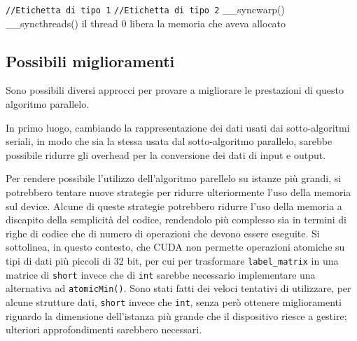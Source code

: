 \documentclass[12pt]{article}
\begin{document}
\begin{algorithm}[H]
{{{{                    }
                    \texttt{//Etichetta di tipo 1}\;
                    \texttt{//Etichetta di tipo 2}\;
                }
            }
            \_\_syncwarp()\;
        }
        \_\_syncthreads()\;
        \;
        il thread 0 libera la memoria che aveva allocato\;
    \end{algorithm}

    \subsection{Possibili miglioramenti}
    \label{PossibiliMiglioramenti}
    Sono possibili diversi approcci per provare a migliorare le prestazioni di questo algoritmo parallelo.

    In primo luogo, cambiando la rappresentazione dei dati usati dai sotto-algoritmi seriali, in modo che sia la stessa usata dal sotto-algoritmo parallelo, sarebbe possibile ridurre gli overhead per la conversione dei dati di input e output.

    Per rendere possibile l'utilizzo dell'algoritmo parellelo su istanze più grandi, si potrebbero tentare nuove strategie per ridurre ulteriormente l'uso della memoria sul device. Alcune di queste strategie potrebbero ridurre l'uso della memoria a discapito della semplicità del codice, rendendolo più complesso sia in termini di righe di codice che di numero di operazioni che devono essere eseguite. Si sottolinea, in questo contesto, che CUDA non permette operazioni atomiche su tipi di dati più piccoli di 32 bit, per cui per trasformare \texttt{label\_matrix} in una matrice di \texttt{short} invece che di \texttt{int} sarebbe necessario implementare una alternativa ad \texttt{atomicMin()}. Sono stati fatti dei veloci tentativi di utilizzare, per alcune strutture dati, \texttt{short} invece che \texttt{int}, senza però ottenere miglioramenti riguardo la dimensione dell'istanza più grande che il dispositivo riesce a gestire; ulteriori approfondimenti sarebbero necessari.
\end{document}
